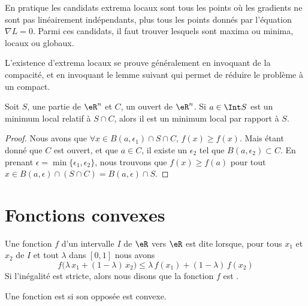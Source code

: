 En pratique les candidats extrema locaux sont tous les points où les gradients ne sont pas linéairement indépendants, plus tous les points donnés par l'équation $\nabla L=0$. Parmi ces candidats, il faut trouver lesquels sont maxima ou minima, locaux ou globaux.

L'existence d'extrema locaux se prouve généralement en invoquant de la compacité, et en invoquant le lemme suivant qui permet de réduire le problème à un compact.

\begin{lemma}       \label{LemmeMinSCimpliqueS}
    Soit $S$, une partie de $\eR^n$ et $C$, un ouvert de $\eR^n$. Si $a\in\Int S$ est un minimum local relatif à $S\cap C$, alors il est un minimum local par rapport à $S$.
\end{lemma}

\begin{proof}
    Nous avons que $\forall x\in B(a,\epsilon_1)\cap S\cap C$, $f(x)\geq f(x)$. Mais étant donné que $C$ est ouvert, et que $a\in C$, il existe un $\epsilon_2$ tel que $B(a,\epsilon_2)\subset C$. En prenant $\epsilon=\min\{ \epsilon_1,\epsilon_2 \}$, nous trouvons que $f(x)\geq f(a)$ pour tout $x\in B(a,\epsilon)\cap(S\cap C)=B(a,\epsilon)\cap S$.
\end{proof}

\section{Fonctions convexes}
\label{SECooVZWWooUjxXYi}

\begin{definition}  \label{DefVQXRJQz}
    Une fonction $f$ d’un intervalle $I$ de \( \eR\) vers \( \eR\) est dite  lorsque, pour tous \( x_1\) et \( x_2\) de $I$ et tout $\lambda$ dans $[0, 1]$ nous avons
    \begin{equation}        \label{EQooYNAPooFePQZy}
        f\big(\lambda\, x_1+(1-\lambda)\, x_2\big) \leq \lambda\, f(x_1)+(1-\lambda)\, f(x_2)
    \end{equation}
    Si l'inégalité est stricte, alors nous disons que la fonction \( f\) est .

    Une fonction est  si son opposée est convexe.
\end{definition}


